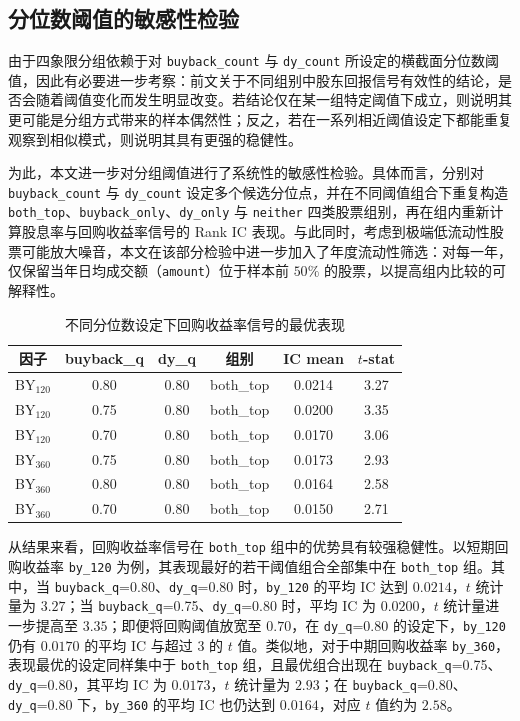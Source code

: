 \documentclass[a4paper,10pt]{article}
\begin{document}
\subsection{分位数阈值的敏感性检验}

由于四象限分组依赖于对 \texttt{buyback\_count} 与 \texttt{dy\_count} 所设定的横截面分位数阈值，因此有必要进一步考察：前文关于不同组别中股东回报信号有效性的结论，是否会随着阈值变化而发生明显改变。若结论仅在某一组特定阈值下成立，则说明其更可能是分组方式带来的样本偶然性；反之，若在一系列相近阈值设定下都能重复观察到相似模式，则说明其具有更强的稳健性。

为此，本文进一步对分组阈值进行了系统性的敏感性检验。具体而言，分别对 \texttt{buyback\_count} 与 \texttt{dy\_count} 设定多个候选分位点，并在不同阈值组合下重复构造 \texttt{both\_top}、\texttt{buyback\_only}、\texttt{dy\_only} 与 \texttt{neither} 四类股票组别，再在组内重新计算股息率与回购收益率信号的 Rank IC 表现。与此同时，考虑到极端低流动性股票可能放大噪音，本文在该部分检验中进一步加入了年度流动性筛选：对每一年，仅保留当年日均成交额（\texttt{amount}）位于样本前 $50\%$ 的股票，以提高组内比较的可解释性。

\begin{table}[H]
\centering
\caption{不同分位数设定下回购收益率信号的最优表现}
\label{tab:quantile_sensitivity_by}
\small
\begin{tabular}{cccccc}
\toprule
因子 & buyback\_q & dy\_q & 组别 & IC mean & $t$-stat \\
\midrule
BY$_{120}$ & 0.80 & 0.80 & both\_top & 0.0214 & 3.27 \\
BY$_{120}$ & 0.75 & 0.80 & both\_top & 0.0200 & 3.35 \\
BY$_{120}$ & 0.70 & 0.80 & both\_top & 0.0170 & 3.06 \\
BY$_{360}$ & 0.75 & 0.80 & both\_top & 0.0173 & 2.93 \\
BY$_{360}$ & 0.80 & 0.80 & both\_top & 0.0164 & 2.58 \\
BY$_{360}$ & 0.70 & 0.80 & both\_top & 0.0150 & 2.71 \\
\bottomrule
\end{tabular}
\end{table}


从结果来看，回购收益率信号在 \texttt{both\_top} 组中的优势具有较强稳健性。以短期回购收益率 \texttt{by\_120} 为例，其表现最好的若干阈值组合全部集中在 \texttt{both\_top} 组。其中，当 \texttt{buyback\_q}=0.80、\texttt{dy\_q}=0.80 时，\texttt{by\_120} 的平均 IC 达到 $0.0214$，$t$ 统计量为 $3.27$；当 \texttt{buyback\_q}=0.75、\texttt{dy\_q}=0.80 时，平均 IC 为 $0.0200$，$t$ 统计量进一步提高至 $3.35$；即便将回购阈值放宽至 $0.70$，在 \texttt{dy\_q}=0.80 的设定下，\texttt{by\_120} 仍有 $0.0170$ 的平均 IC 与超过 $3$ 的 $t$ 值。类似地，对于中期回购收益率 \texttt{by\_360}，表现最优的设定同样集中于 \texttt{both\_top} 组，且最优组合出现在 \texttt{buyback\_q}=0.75、\texttt{dy\_q}=0.80，其平均 IC 为 $0.0173$，$t$ 统计量为 $2.93$；在 \texttt{buyback\_q}=0.80、\texttt{dy\_q}=0.80 下，\texttt{by\_360} 的平均 IC 也仍达到 $0.0164$，对应 $t$ 值约为 $2.58$。
\end{document}
